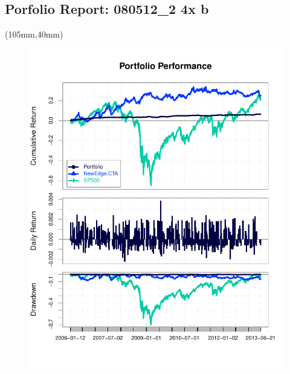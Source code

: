 \documentclass[nohyper,justified]{tufte-handout}\usepackage{graphicx, color}
\makeatletter
\def\maxwidth{ %
  \ifdim\Gin@nat@width>\linewidth
    \linewidth
  \else
    \Gin@nat@width
  \fi
}
\newenvironment{knitrout}{}{} %
\makeatother
\begin{document}
 



\begin{wide}
\section{\Huge Porfolio Report: 080512_2 4x b }

\hrulefill 
\end{wide}

\begin{textblock*}{105mm}(105mm,40mm)
\begin{figure}
\vspace{0pt}
\begin{knitrout}
\color{fgcolor}
\includegraphics[width=\maxwidth]{figure/Performance} 

\end{knitrout}

\end{figure}
\end{textblock*}
\end{document}
